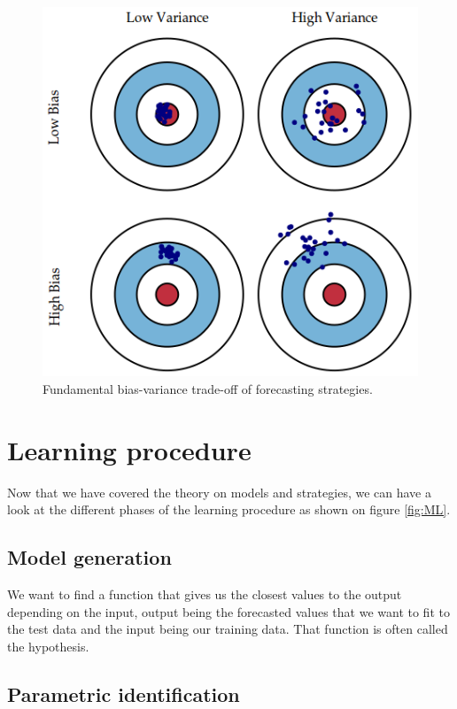 \documentclass[11pt,a4paper,oneside]{book}
\begin{document}
\begin{figure}[!h]
  \centering
    \includegraphics[scale=0.5]{img/bias-variance.png}
  \caption{Fundamental bias-variance trade-off of forecasting strategies.}
  \label{fig:biasvariance}
\end{figure}




\section{Learning procedure}

Now that we have covered the theory on models and strategies, we can have a look at the different phases of the learning procedure as shown on figure \ref{fig:ML}.


\subsection{Model generation}

We want to find a function that gives us the closest values to the output depending on the input, output being the forecasted values that we want to fit to the test data and the input being our training data. That function is often called the hypothesis. \cite{BenTaieb}


\subsection{Parametric identification}
\end{document}
